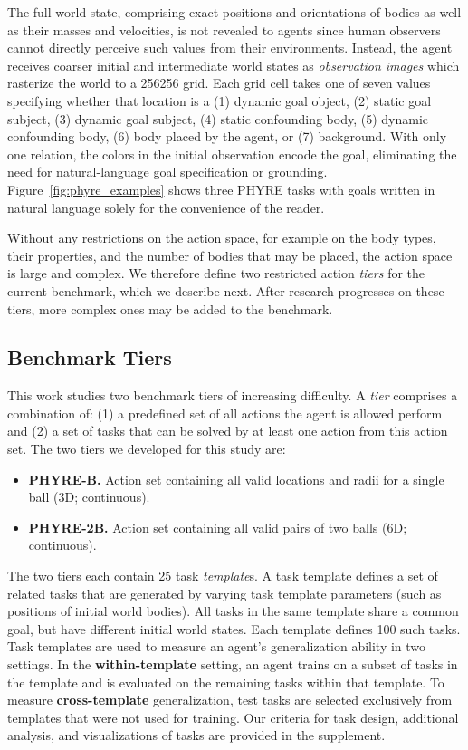 \documentclass{article}
\begin{document}
The full world state, comprising exact positions and orientations of bodies as well as their masses and velocities, is not revealed to agents since human observers cannot directly perceive such values from their environments.
Instead, the agent receives coarser initial and intermediate world states as \emph{observation images} which rasterize the world to a 256256 grid. Each grid cell takes one of seven values specifying whether that location is a (1) dynamic goal object, (2) static goal subject, (3) dynamic goal subject, (4) static confounding body, (5) dynamic confounding body, (6) body placed by the agent, or (7) background. With only one relation, the colors in the initial observation encode the goal, eliminating the need for natural-language goal specification or grounding. Figure~\ref{fig:phyre_examples} shows three PHYRE tasks with goals written in natural language solely for the convenience of the reader.

Without any restrictions on the action space, for example on the body types, their properties, and the number of bodies that may be placed, the action space is large and complex. We therefore define two restricted action \emph{tiers} for the current benchmark, which we describe next. After research progresses on these tiers, more complex ones may be added to the benchmark.

\subsection{Benchmark Tiers}
\label{sec:benchmark_tiers}
This work studies two benchmark tiers of increasing difficulty. A \emph{tier} comprises a combination of: (1) a predefined set of all actions the agent is allowed perform and (2) a set of tasks that can be solved by at least one action from this action set. The two tiers we developed for this study are:
\begin{itemize}[leftmargin=*]
\setlength\itemsep{0em}
\item \textbf{PHYRE-B.} Action set containing all valid locations and radii for a single ball (3D; continuous).
\item \textbf{PHYRE-2B.} Action set containing all valid pairs of two balls (6D; continuous).
\end{itemize}
The two tiers each contain 25 task \emph{template}s. A task template defines a set of related tasks that are generated by varying task template parameters (such as positions of initial world bodies). All tasks in the same template share a common goal, but have different initial world states. Each template defines 100 such tasks. Task templates are used to measure an agent's generalization ability in two settings. In the \textbf{within-template} setting, an agent trains on a subset of tasks in the template and is evaluated on the remaining tasks within that template. To measure \textbf{cross-template} generalization, test tasks are selected exclusively from templates that were not used for training. Our criteria for task design, additional analysis, and visualizations of tasks are provided in the supplement.
\end{document}
